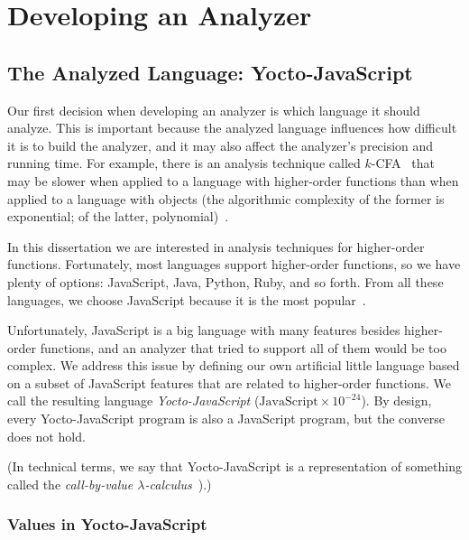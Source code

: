 \documentclass[12pt, oneside]{book}
\begin{document}
\chapter{Developing an Analyzer}


\section{The Analyzed Language: Yocto-JavaScript}
\label{The Analyzed Language: Yocto-JavaScript}

Our first decision when developing an analyzer is which language it should analyze. This is important because the analyzed language influences how difficult it is to build the analyzer, and it may also affect the analyzer’s precision and running time. For example, there is an analysis technique called $k$-CFA~\cite{k-cfa} that may be slower when applied to a language with higher-order functions than when applied to a language with objects (the algorithmic complexity of the former is exponential; of the latter, polynomial)~\cite{m-cfa}.

In this dissertation we are interested in analysis techniques for higher-order functions. Fortunately, most languages support higher-order functions, so we have plenty of options: JavaScript, Java, Python, Ruby, and so forth. From all these languages, we choose JavaScript because it is the most popular~\cite{stack-overflow-developer-survey, jet-brains-developer-survey}.

Unfortunately, JavaScript is a big language with many features besides higher-order functions, and an analyzer that tried to support all of them would be too complex. We address this issue by defining our own artificial little language based on a subset of JavaScript features that are related to higher-order functions. We call the resulting language \emph{Yocto-JavaScript} ($\mathrm{JavaScript} \times 10^{-24}$). By design, every Yocto-JavaScript program is also a JavaScript program, but the converse does not hold.

(In technical terms, we say that Yocto-JavaScript is a representation of something called the \emph{call-by-value $\lambda$-calculus}~\cite[§~6]{understanding-computation}).)

\subsection{Values in Yocto-JavaScript}
\label{Values in Yocto-JavaScript}
\end{document}

